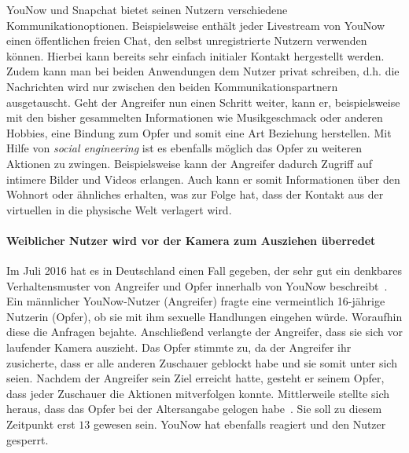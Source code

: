 YouNow und Snapchat bietet seinen Nutzern verschiedene Kommunikationoptionen.
Beispielsweise enth\"alt jeder Livestream von YouNow einen \"offentlichen
freien Chat, den selbst unregistrierte Nutzern verwenden k\"onnen. Hierbei kann
bereits sehr einfach initialer Kontakt hergestellt werden. Zudem kann man bei
beiden Anwendungen dem Nutzer privat schreiben, d.h. die Nachrichten wird nur
zwischen den beiden Kommunikationspartnern ausgetauscht. Geht der Angreifer nun
einen Schritt weiter, kann er, beispielsweise mit den bisher gesammelten
Informationen wie Musikgeschmack oder anderen Hobbies, eine Bindung zum Opfer
und somit eine Art Beziehung herstellen. Mit Hilfe von \emph{social
engineering} ist es ebenfalls m\"oglich das Opfer zu weiteren Aktionen zu
zwingen. Beispielsweise kann der Angreifer dadurch Zugriff auf intimere Bilder
und Videos erlangen. Auch kann er somit Informationen \"uber den Wohnort oder
\"ahnliches erhalten, was zur Folge hat, dass der Kontakt aus der virtuellen in
die physische Welt verlagert wird.

\paragraph{Weiblicher Nutzer wird vor der Kamera zum Ausziehen \"uberredet} Im
Juli 2016 hat es in Deutschland einen Fall gegeben, der sehr gut ein denkbares
Verhaltensmuster von Angreifer und Opfer innerhalb von YouNow
beschreibt~\cite{yn-erciitv}. Ein m\"annlicher YouNow-Nutzer (Angreifer) fragte
eine vermeintlich 16-j\"ahrige Nutzerin (Opfer), ob sie mit ihm sexuelle
Handlungen eingehen w\"urde. Woraufhin diese die Anfragen bejahte.
Anschlie{\ss}end verlangte der Angreifer, dass sie sich vor laufender Kamera
auszieht. Das Opfer stimmte zu, da der Angreifer ihr zusicherte, dass er alle
anderen Zuschauer geblockt habe und sie somit unter sich seien. Nachdem der
Angreifer sein Ziel erreicht hatte, gesteht er seinem Opfer, dass jeder
Zuschauer die Aktionen mitverfolgen konnte. Mittlerweile stellte sich heraus,
dass das Opfer bei der Altersangabe gelogen habe~\cite{yn-erciitv}. Sie soll zu
diesem Zeitpunkt erst $13$ gewesen sein. YouNow hat ebenfalls reagiert und den
Nutzer gesperrt.
